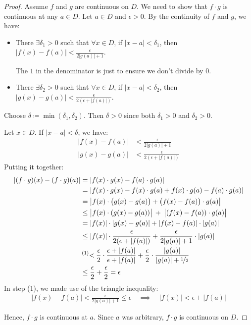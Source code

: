 \begin{proof}
    Assume $f$ and $g$ are continuous on $D$. We need to show that $f \cdot g$ is continuous at any $a \in D$. Let $a \in D$ and $\epsilon > 0$. By the continuity of $f$ and $g$, we have:

    \begin{itemize}
        \item There $\exists \delta_1 > 0$ such that
        $\forall x \in D$, if $|x - a| < \delta_1$,
        then $\displaystyle |f(x) - f(a)|
            < \frac{\epsilon}{2|g(a)| + 1}$.

        The $1$ in the denominator is just to ensure we don't divide by $0$.

        \item There $\exists \delta_2 > 0$ such that
        $\forall x \in D$, if $|x - a| < \delta_2$,
        then $\displaystyle |g(x) - g(a)|
            < \frac{\epsilon}{2(\epsilon + |f(a)|)}$.
    \end{itemize}

    Choose $\delta \coloneqq \min(\delta_1, \delta_2)$. Then $\delta > 0$ since both $\delta_1 > 0$ and $\delta_2 > 0$.
    
    Let $x\in D$. If $|x - a| < \delta$, we have:
    \begin{align*}
        |f(x) - f(a)| &< \frac{\epsilon}{2|g(a)| + 1}\\
        |g(x) - g(a)| &< \frac{\epsilon}{2(\epsilon + |f(a)|)}
    \end{align*}
    Putting it together:
    \begin{align*}
        |(f \cdot g)(x) - (f \cdot g)(a)|
        &= |f(x) \cdot g(x) - f(a) \cdot g(a)| \\
        &= |f(x) \cdot g(x) - f(x) \cdot g(a) + f(x) \cdot g(a) - f(a) \cdot g(a)| \\
        &= \bigl|f(x) \cdot \bigl(g(x) - g(a)\bigr)
            + \bigl(f(x) - f(a)\bigr) \cdot g(a) \bigr| \\
        &\leq \bigl|f(x) \cdot (g(x) - g(a)) \bigr|
            \: + \: \bigl|(f(x) - f(a)) \cdot g(a) \bigr| \\
        &= |f(x)| \cdot |g(x) - g(a)|+ |f(x) - f(a)| \cdot |g(a)|\\
        &\leq |f(x)| \cdot \frac{\epsilon}{2 (\epsilon + |f(a)|)}
            + \frac{\epsilon}{2 |g(a)| + 1} \cdot |g(a)| \\
        &\prescript{(1)}{}{<} \:
            \frac{\epsilon}{2} \cdot \frac{\epsilon + |f(a)|}{\epsilon + |f(a)|}
            + \frac{\epsilon}{2} \cdot \frac{|g(a)|}{|g(a)| + \nicefrac{1}{2}} \\
        &\leq \frac{\epsilon}{2} + \frac{\epsilon}{2} = \epsilon
    \end{align*}
    In step (1), we made use of the triangle inequality:
    \begin{align}
        |f(x) - f(a)| < \frac{\epsilon}{2|g(a)| + 1} \leq \epsilon
        \quad \implies \quad
        |f(x)| < \epsilon + |f(a)|
    \end{align}

    Hence, $f \cdot g$ is continuous at $a$. Since $a$ was arbitrary, $f \cdot g$ is continuous on $D$.
\end{proof}
